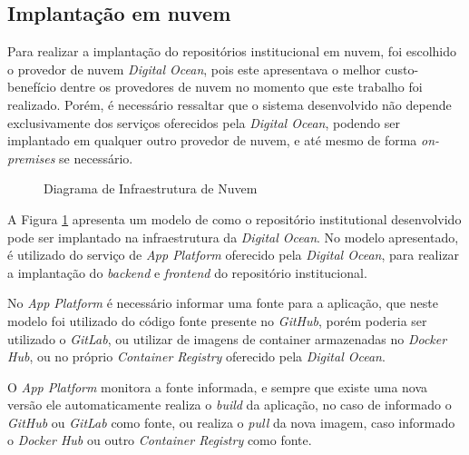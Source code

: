 \subsection{Implantação em nuvem}

Para realizar a implantação do repositórios institucional em nuvem, foi escolhido
o provedor de nuvem \emph{Digital Ocean}, pois este apresentava o melhor custo-benefício
dentre os provedores de nuvem no momento que este trabalho foi realizado. Porém, é
necessário ressaltar que o sistema desenvolvido não depende exclusivamente dos
serviços oferecidos pela \emph{Digital Ocean}, podendo ser implantado em qualquer
outro provedor de nuvem, e até mesmo de forma \emph{on-premises} se necessário.

\begin{figure}[H]
    \caption{Diagrama de Infraestrutura de Nuvem}
    \centering
    \label{fig:do_infra}
\end{figure}

A Figura \ref{fig:do_infra} apresenta um modelo de como o repositório institutional
desenvolvido pode ser implantado na infraestrutura da \emph{Digital Ocean}.
No modelo apresentado, é utilizado do serviço de \emph{App Platform} oferecido pela
\emph{Digital Ocean}, para realizar a implantação do \emph{backend} e \emph{frontend}
do repositório institucional.

No \emph{App Platform} é necessário informar uma fonte para a aplicação, que neste
modelo foi utilizado do código fonte presente no \emph{GitHub}, porém poderia ser
utilizado o \emph{GitLab}, ou utilizar de imagens de container armazenadas no
\emph{Docker Hub}, ou no próprio \emph{Container Registry} oferecido pela
\emph{Digital Ocean}.

O \emph{App Platform} monitora a fonte informada, e sempre que existe uma nova versão
ele automaticamente realiza o \emph{build} da aplicação, no caso de informado o
\emph{GitHub} ou \emph{GitLab} como fonte, ou realiza o \emph{pull} da nova imagem,
caso informado o \emph{Docker Hub} ou outro \emph{Container Registry} como fonte.

